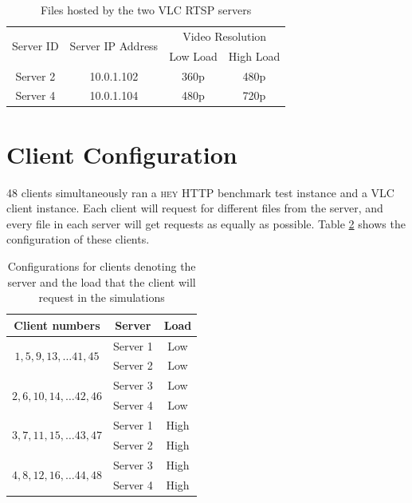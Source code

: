 \begin{table}[htbp]
    \centering
    \begin{tabular}{cccc}
        \toprule
        \multirow{2}{*}{Server ID} & \multirow{2}{*}{Server IP Address} & \multicolumn{2}{c}{Video Resolution} \\
         &  & Low Load & High Load \\
        \midrule
        Server 2 & 10.0.1.102 & 360p & 480p \\
        Server 4 & 10.0.1.104 & 480p & 720p  \\
        \bottomrule
    \end{tabular}
    \caption{Files hosted by the two VLC RTSP servers}
    \label{tab:vlcconfig}
\end{table}

\section{Client Configuration}
48 clients simultaneously ran a \textsc{hey} HTTP benchmark test instance and a VLC client instance. Each client will request for different files from the server, and every file in each server will get requests as equally as possible. Table \ref{tab:clientconfig} shows the configuration of these clients.

\begin{table}[htbp]
    \centering
    \begin{tabular}{ccc}
    \toprule
        Client numbers & Server & Load\\
    \midrule
        \multirow{2}{*}{$1, 5, 9, 13, \dots 41, 45$}  & Server 1 & Low \\
        & Server 2 & Low \\ \hline
        \multirow{2}{*}{$2, 6, 10, 14, \dots 42, 46$}  & Server 3 & Low \\
        & Server 4 & Low \\ \hline
        \multirow{2}{*}{$3, 7, 11, 15, \dots 43, 47$}  & Server 1 & High \\
        & Server 2 & High \\ \hline
        \multirow{2}{*}{$4, 8, 12, 16, \dots 44, 48$}  & Server 3 & High \\
        & Server 4 & High \\
    \bottomrule
    \end{tabular}
    \caption{Configurations for clients denoting the server and the load that the client will request in the simulations}
    \label{tab:clientconfig}
\end{table}

